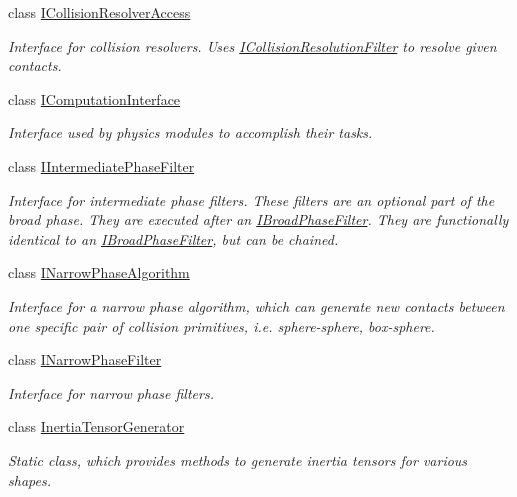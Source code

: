 \begin{DoxyCompactItemize}
class \mbox{\hyperlink{classr3_1_1_i_collision_resolver_access}{I\+Collision\+Resolver\+Access}}
\begin{DoxyCompactList}\small\item\em Interface for collision resolvers. Uses \mbox{\hyperlink{classr3_1_1_i_collision_resolution_filter}{I\+Collision\+Resolution\+Filter}} to resolve given contacts. \end{DoxyCompactList}\item 
class \mbox{\hyperlink{classr3_1_1_i_computation_interface}{I\+Computation\+Interface}}
\begin{DoxyCompactList}\small\item\em Interface used by physics modules to accomplish their tasks. \end{DoxyCompactList}\item 
class \mbox{\hyperlink{classr3_1_1_i_intermediate_phase_filter}{I\+Intermediate\+Phase\+Filter}}
\begin{DoxyCompactList}\small\item\em Interface for intermediate phase filters. These filters are an optional part of the broad phase. They are executed after an \mbox{\hyperlink{classr3_1_1_i_broad_phase_filter}{I\+Broad\+Phase\+Filter}}. They are functionally identical to an \mbox{\hyperlink{classr3_1_1_i_broad_phase_filter}{I\+Broad\+Phase\+Filter}}, but can be chained. \end{DoxyCompactList}\item 
class \mbox{\hyperlink{classr3_1_1_i_narrow_phase_algorithm}{I\+Narrow\+Phase\+Algorithm}}
\begin{DoxyCompactList}\small\item\em Interface for a narrow phase algorithm, which can generate new contacts between one specific pair of collision primitives, i.\+e. sphere-\/sphere, box-\/sphere. \end{DoxyCompactList}\item 
class \mbox{\hyperlink{classr3_1_1_i_narrow_phase_filter}{I\+Narrow\+Phase\+Filter}}
\begin{DoxyCompactList}\small\item\em Interface for narrow phase filters. \end{DoxyCompactList}\item 
class \mbox{\hyperlink{classr3_1_1_inertia_tensor_generator}{Inertia\+Tensor\+Generator}}
\begin{DoxyCompactList}\small\item\em Static class, which provides methods to generate inertia tensors for various shapes. \end{DoxyCompactList}\item 

\end{DoxyCompactItemize}
